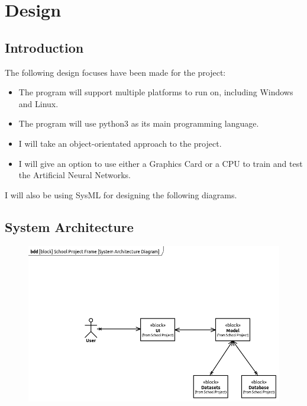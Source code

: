 \documentclass[./project-report/src/latex/project-report.tex]{subfiles}
\begin{document}
\maketitle

\section{Design}

\subsection{Introduction}

The following design focuses have been made for the project:

\begin{itemize}
    \item The program will support multiple platforms to run on, including Windows and Linux.
    \item The program will use python3 as its main programming language.
    \item I will take an object-orientated approach to the project.
    \item I will give an option to use either a Graphics Card or a CPU to train and test the Artificial Neural Networks.
\end{itemize}

I will also be using SysML for designing the following diagrams.

\subsection{System Architecture}

\begin{figure}[h!]
\centering
\includegraphics[width=1\textwidth]{./project-report/src/images/system-architecture-diagram.png}
\end{figure}
\end{document}
